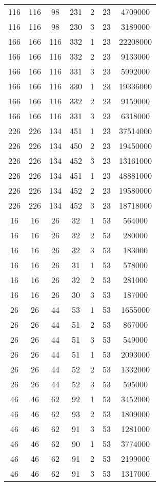 \documentclass[a4paper,11pt]{article}
\begin{document}
\begin{longtable}{ |c|c|c|c|c|c|c| }
116 & 116 & 98 & 231 & 2 & 23 & 4709000 \\
116 & 116 & 98 & 230 & 3 & 23 & 3189000 \\
166 & 166 & 116 & 332 & 1 & 23 & 22208000 \\
166 & 166 & 116 & 332 & 2 & 23 & 9133000 \\
166 & 166 & 116 & 331 & 3 & 23 & 5992000 \\
166 & 166 & 116 & 330 & 1 & 23 & 19336000 \\
166 & 166 & 116 & 332 & 2 & 23 & 9159000 \\
166 & 166 & 116 & 331 & 3 & 23 & 6318000 \\
226 & 226 & 134 & 451 & 1 & 23 & 37514000 \\
226 & 226 & 134 & 450 & 2 & 23 & 19450000 \\
226 & 226 & 134 & 452 & 3 & 23 & 13161000 \\
226 & 226 & 134 & 451 & 1 & 23 & 48881000 \\
226 & 226 & 134 & 452 & 2 & 23 & 19580000 \\
226 & 226 & 134 & 452 & 3 & 23 & 18718000 \\
16 & 16 & 26 & 32 & 1 & 53 & 564000 \\
16 & 16 & 26 & 32 & 2 & 53 & 280000 \\
16 & 16 & 26 & 32 & 3 & 53 & 183000 \\
16 & 16 & 26 & 31 & 1 & 53 & 578000 \\
16 & 16 & 26 & 32 & 2 & 53 & 281000 \\
16 & 16 & 26 & 30 & 3 & 53 & 187000 \\
26 & 26 & 44 & 53 & 1 & 53 & 1655000 \\
26 & 26 & 44 & 51 & 2 & 53 & 867000 \\
26 & 26 & 44 & 51 & 3 & 53 & 549000 \\
26 & 26 & 44 & 51 & 1 & 53 & 2093000 \\
26 & 26 & 44 & 52 & 2 & 53 & 1332000 \\
26 & 26 & 44 & 52 & 3 & 53 & 595000 \\
46 & 46 & 62 & 92 & 1 & 53 & 3452000 \\
46 & 46 & 62 & 93 & 2 & 53 & 1809000 \\
46 & 46 & 62 & 91 & 3 & 53 & 1281000 \\
46 & 46 & 62 & 90 & 1 & 53 & 3774000 \\
46 & 46 & 62 & 91 & 2 & 53 & 2199000 \\
46 & 46 & 62 & 91 & 3 & 53 & 1317000 \\

\end{longtable}
\end{document}
